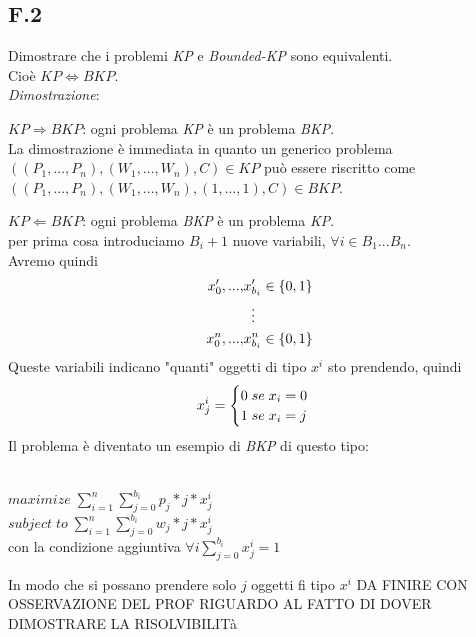 \documentclass[a4paper]{article}
\newenvironment{dimostrazione}{\textit{Dimostrazione}:\begin{adjustwidth}{1cm}{}}{\end{adjustwidth}}
\begin{document}
\subsection{F.2}
Dimostrare che i problemi \emph{KP} e \emph{Bounded-KP} sono equivalenti.\\Cioè $KP \Leftrightarrow BKP$.\\
\begin{dimostrazione}
	$KP \Rightarrow BKP$: ogni problema \emph{KP} è un problema \emph{BKP}.\\
	La dimostrazione è immediata in quanto un generico problema\\$((P_1, ... ,P_n),(W_1, ... ,W_n),C)\in KP$ può essere riscritto come\\ $((P_1, ... ,P_n),(W_1, ... ,W_n),(1, ... ,1),C) \in BKP$.

	$KP \Leftarrow BKP$: ogni problema \emph{BKP} è un problema \emph{KP}.\\
	per prima cosa introduciamo $B_i + 1$ nuove variabili, $\forall i \in B_1 ... B_n$.\\
	Avremo quindi
	\begin{align}
		x_{0}', ... ,&x_{b_i}' \in \{0,1\}  \notag \\
   		&\;\;\vdots \notag \\
		x_{0}^n, ... ,&x_{b_i}^n \in \{0,1\}  \notag 
	\end{align}
	Queste variabili indicano "quanti" oggetti di tipo $x^i$ sto prendendo, quindi 
	\begin{equation}
		x_{j}^i=\begin{cases}
      		0\; se\; x_i = 0\\
      		1\; se\; x_i = j \notag
    		\end{cases}
	\end{equation}
	Il problema è diventato un esempio di \emph{BKP} di questo tipo:
	\begin{center}
		\\
		$maximize \; \sum_{i=1}^{n} \sum_{j=0}^{b_i} p_j*j*x^i_j$\\
		$subject \; to \; \sum_{i=1}^{n} \sum_{j=0}^{b_i} w_j*j*x^i_j$\\
		con la condizione aggiuntiva $ \forall i \sum_{j=0}^{b_i} x_j^i = 1$
	\end{center}
	In modo che  si possano prendere solo $j$ oggetti fi tipo $x^i$
	DA FINIRE CON OSSERVAZIONE DEL PROF RIGUARDO AL FATTO DI DOVER DIMOSTRARE LA RISOLVIBILITà
\end{dimostrazione}
\end{document}
